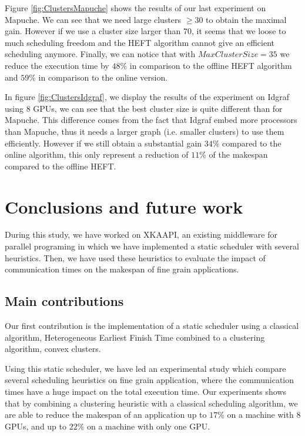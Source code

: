 \documentclass[10pt, conference, compsocconf,pdftex,dvipsnames]{IEEEtran}
\begin{document}
Figure \ref{fig:ClustersMapuche} shows the results of our last experiment on
Mapuche. We can see that we need large clusters $\geq 30$ to obtain the maximal
gain. However if we use a cluster size larger than $70$, it seems that we
loose to much scheduling freedom and the HEFT algorithm cannot give an efficient
scheduling anymore. Finally, we can notice that with $MaxClusterSize=35$ we
reduce the execution time by $48\%$ in comparison to the offline HEFT
algorithm and $59\%$ in comparison to the online version.

In figure \ref{fig:ClustersIdgraf}, we display the results of the experiment
on Idgraf using $8$ GPUs, we can see that the best cluster size is quite
different than for Mapuche. This difference comes from the fact that Idgraf
embed more processors than Mapuche, thus it needs a larger graph (i.e.
smaller clusters) to use them efficiently. However if we still obtain a
substantial gain $34\%$ compared to the online algorithm, this only represent
a reduction of $11\%$ of the makespan compared to the offline HEFT.  

\section{Conclusions and future work}
\label{sec:cncl}
During this study, we have worked on
XKAAPI\cite{gautier2007kaapi,gautierxkaapi}, an existing middleware for
parallel programing in which we have implemented a static scheduler with
several heuristics. Then, we have used these heuristics to evaluate the impact
of communication times on the makespan of fine grain applications.

\subsection{Main contributions}
\label{chap:cncl-contrib}
Our first contribution is the implementation of a static scheduler using
a classical algorithm, Heterogeneous Earliest Finish Time combined to a
clustering algorithm, convex clusters. 

Using this static scheduler, we have led an experimental study which compare
several scheduling heuristics on fine grain application, where the
communication times have a huge impact on the total execution time.  Our
experiments shows that by combining a clustering heuristic with a classical
scheduling algorithm, we are able to reduce the makespan of an application  up
to $17\%$ on a machine with $8$ GPUs, and up to $22\%$ on a machine with only
one GPU.
\end{document}
